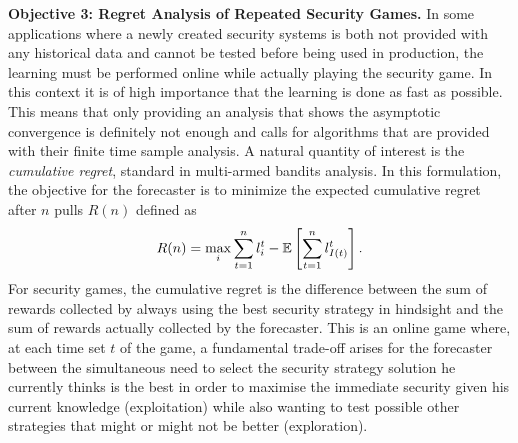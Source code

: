 
\textbf{Objective 3: Regret Analysis of Repeated Security Games.}
In some applications where a newly created security systems is both not provided with any  historical data and cannot be tested before being used in production, the learning must be performed online while actually playing the security game. In this context it is of high importance that the learning is done as fast as possible. This means that only providing an analysis that shows the asymptotic convergence is definitely not enough and  calls for algorithms that are provided with their finite time sample analysis. A natural quantity of interest is the  \textit{cumulative regret},  standard  in multi-armed bandits analysis. In this formulation, the objective for the forecaster is to minimize the expected cumulative regret after $n$ pulls $R(n)$ defined as
%
\begin{equation*}
R(n)=\max_i\sum^n_{t=1} l^t_{i}-{\mathbb{E}}\left[\sum_{t=1}^n l^t_{I(t)}\right].
\end{equation*}
%
For security games, the cumulative regret is the difference between the sum of rewards collected by always using the best security strategy in hindsight and the sum of rewards actually collected by the forecaster.
This is an online game where, at each time set $t$ of the game, a fundamental trade-off arises for the forecaster between the simultaneous need to select the security strategy solution he currently thinks is the best in order to maximise the immediate security given his current knowledge  (exploitation)  while also wanting to test possible other strategies that might or might not be better (exploration).

